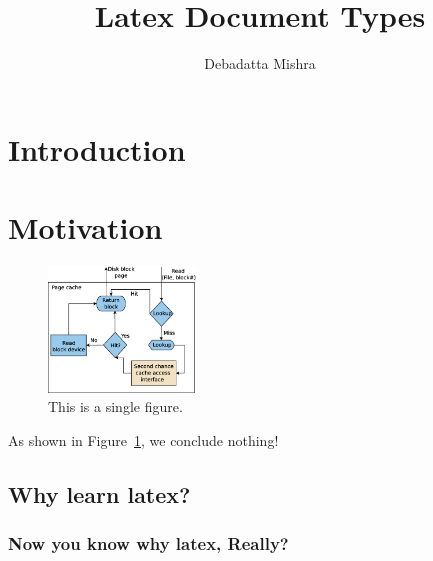 \documentclass[a4paper, 11pt,twocolumn]{article}
\title{Latex Document Types}
\author{Debadatta Mishra}
\date{}
\begin{document}
\maketitle
\begin{abstract}
\lipsum[15]
\end{abstract}    
\section{Introduction}
\lipsum[70]


\section{Motivation}

\begin{figure}
\centering
\includegraphics[width=0.35\textwidth]{cc_get.eps}
 \caption{This is a single figure.}
 \label{fig:cc_get}
\end{figure}

As shown in Figure~\ref{fig:cc_get}, we conclude nothing!
\lipsum[50]
\subsection{Why learn latex?}
\lipsum[50]

\lipsum[50]


\lipsum[50]

\subsubsection{Now you know why latex, Really?}
\lipsum[50]

\lipsum[50]
\end{document}
